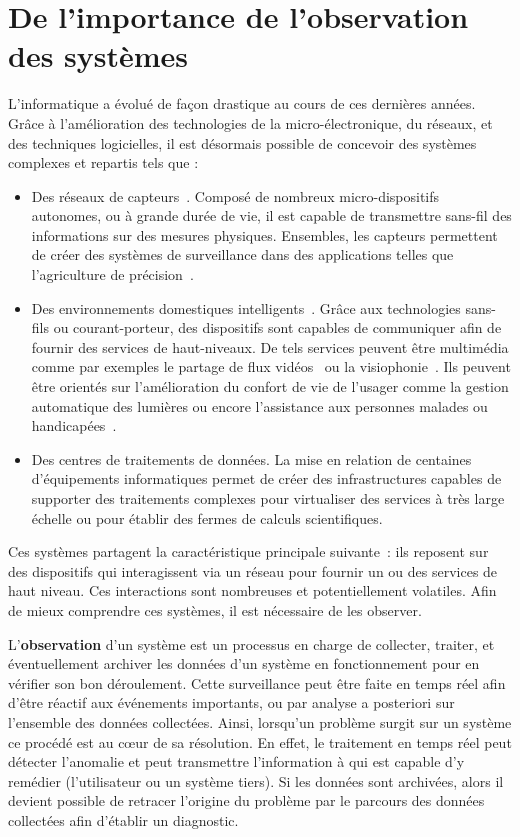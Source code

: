 \section{De l'importance de l'observation des systèmes}\label{sec:intro:contexte}
L'informatique a évolué de façon drastique au cours de ces dernières années. Grâce à l'amélioration des technologies de la micro-électronique, du réseaux, et des techniques logicielles, il est désormais possible de concevoir des systèmes complexes et repartis tels que :
\begin{itemize}
 \item Des réseaux de capteurs~\cite{Akyildiz:wsn,Szewczyk:monitoring}. Composé de nombreux micro-dispositifs autonomes, ou à grande durée de vie, il est capable de transmettre sans-fil des informations sur des mesures physiques. Ensembles, les capteurs permettent de créer des systèmes de surveillance dans des applications telles que l'agriculture de précision~\cite{Jurdak:sumac}.
 \item Des environnements domestiques intelligents~\cite{Harper:smarthome, Chan:smarthome, Coyle:assisted}. Grâce aux technologies sans-fils ou courant-porteur, des dispositifs sont capables de communiquer afin de fournir des services de haut-niveaux. De tels services peuvent être multimédia comme par exemples le partage de flux vidéos~\cite{Kang:upnpav} ou la visiophonie~\cite{Vilei:videophone}. Ils peuvent être orientés sur l'amélioration du confort de vie de l'usager comme la gestion automatique des lumières ou encore l'assistance aux personnes malades ou handicapées~\cite{Korhonen:health}.
 \item Des centres de traitements de données. La mise en relation de centaines d'équipements informatiques permet de créer des infrastructures capables de supporter des traitements complexes pour virtualiser des services à très large échelle ou pour établir des fermes de calculs scientifiques.
\end{itemize}

Ces systèmes partagent la caractéristique principale suivante~: ils reposent sur des dispositifs qui interagissent via un réseau pour fournir un ou des services de haut niveau. Ces interactions sont nombreuses et potentiellement volatiles. Afin de mieux comprendre ces systèmes, il est nécessaire de les observer.

L'\textbf{observation} d'un système est un processus en charge de collecter, traiter, et éventuellement archiver les données d'un système en fonctionnement pour en vérifier son bon déroulement. Cette surveillance peut être faite en temps réel afin d'être réactif aux événements importants, ou par analyse a posteriori sur l'ensemble des données collectées. Ainsi, lorsqu'un problème surgit sur un système ce procédé est au cœur de sa résolution. En effet, le traitement en temps réel peut détecter l'anomalie et peut transmettre l'information à qui est capable d'y remédier (l'utilisateur ou un système tiers). Si les données sont archivées, alors il devient possible de retracer l'origine du problème par le parcours des données collectées afin d'établir un diagnostic.

